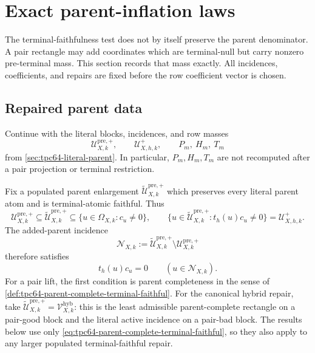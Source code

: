 \section{Exact parent-inflation laws}
\label{sec:tpc64-inflation-laws}

The terminal-faithfulness test does not by itself preserve the parent
denominator.  A pair rectangle may add coordinates which are terminal-null
but carry nonzero pre-terminal mass.  This section records that mass exactly.
All incidences, coefficients, and repairs are fixed before the row
coefficient vector is chosen.

\subsection{Repaired parent data}

Continue with the literal blocks, incidences, and row masses
\[
 \mathcal U_{X,k}^{\mathrm{pre},+},\qquad
 \mathcal U_{X,h,k}^{+},\qquad
 P_m,\ H_m,\ T_m
\]
from \cref{sec:tpc64-literal-parent}.  In particular, \(P_m,H_m,T_m\)
are not recomputed after a pair projection or terminal restriction.

Fix a populated parent enlargement
\(\widetilde{\mathcal U}_{X,k}^{\mathrm{pre},+}\) which preserves every
literal parent atom and is terminal-atomic faithful.  Thus
\begin{equation}
 \mathcal U_{X,k}^{\mathrm{pre},+}
 \subseteq\widetilde{\mathcal U}_{X,k}^{\mathrm{pre},+}
 \subseteq\{u\in\Omega_{X,k}:c_u\ne0\},
 \qquad
 \{u\in\widetilde{\mathcal U}_{X,k}^{\mathrm{pre},+}:
               t_h(u)c_u\ne0\}
 =\mathcal U_{X,h,k}^{+}.
 \label{eq:tpc64-parent-complete-terminal-faithful}
\end{equation}
The added-parent incidence
\begin{equation}
 \mathcal N_{X,k}
 :=\widetilde{\mathcal U}_{X,k}^{\mathrm{pre},+}
      \setminus\mathcal U_{X,k}^{\mathrm{pre},+}
 \label{eq:tpc64-new-parent-incidence}
\end{equation}
therefore satisfies
\begin{equation}
 t_h(u)c_u=0
 \qquad(u\in\mathcal N_{X,k}).
 \label{eq:tpc64-new-parent-terminal-null}
\end{equation}
For a pair lift, the first condition is parent completeness in the sense
of \cref{def:tpc64-parent-complete-terminal-faithful}.  For the canonical
hybrid repair, take
\(\widetilde{\mathcal U}_{X,k}^{\mathrm{pre},+}
=\mathcal V_{X,k}^{\mathrm{hyb}}\): this is the least admissible
parent-complete rectangle on a pair-good block and the literal active
incidence on a pair-bad block.  The results below use only
\eqref{eq:tpc64-parent-complete-terminal-faithful}, so they also apply to
any larger populated terminal-faithful repair.

